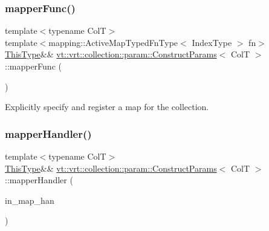 \subsubsection{\texorpdfstring{mapper\+Func()}{mapperFunc()}}
{\footnotesize\ttfamily template$<$typename ColT$>$ \\
template$<$mapping\+::\+Active\+Map\+Typed\+Fn\+Type$<$ Index\+Type $>$ fn$>$ \\
\hyperlink{structvt_1_1vrt_1_1collection_1_1param_1_1_construct_params_a13d4910c0f6825c7b0ddfebce5288bea}{This\+Type}\&\& \hyperlink{structvt_1_1vrt_1_1collection_1_1param_1_1_construct_params}{vt\+::vrt\+::collection\+::param\+::\+Construct\+Params}$<$ ColT $>$\+::mapper\+Func (\begin{DoxyParamCaption}{ }\end{DoxyParamCaption})\hspace{0.3cm}{\ttfamily [inline]}}



Explicitly specify and register a map for the collection. 

\mbox{\label{structvt_1_1vrt_1_1collection_1_1param_1_1_construct_params_a6e8498d29e4daaade3e4cb4b6dfa05de}} 
\subsubsection{\texorpdfstring{mapper\+Handler()}{mapperHandler()}}
{\footnotesize\ttfamily template$<$typename ColT$>$ \\
\hyperlink{structvt_1_1vrt_1_1collection_1_1param_1_1_construct_params_a13d4910c0f6825c7b0ddfebce5288bea}{This\+Type}\&\& \hyperlink{structvt_1_1vrt_1_1collection_1_1param_1_1_construct_params}{vt\+::vrt\+::collection\+::param\+::\+Construct\+Params}$<$ ColT $>$\+::mapper\+Handler (\begin{DoxyParamCaption}\item[{\hyperlink{namespacevt_af64846b57dfcaf104da3ef6967917573}{Handler\+Type}}]{in\+\_\+map\+\_\+han }\end{DoxyParamCaption})\hspace{0.3cm}{\ttfamily [inline]}}



